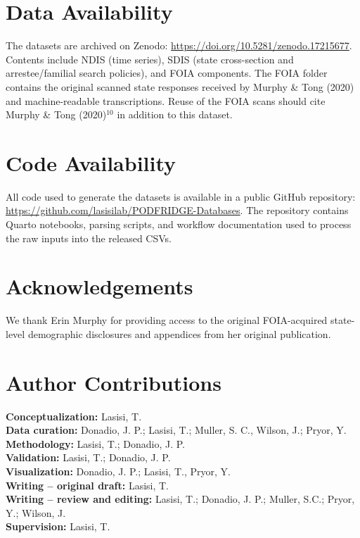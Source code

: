 \documentclass[11pt]{article}
\begin{document}
\clearpage

\section*{Data Availability}

The datasets are archived on Zenodo: \url{https://doi.org/10.5281/zenodo.17215677}. Contents include NDIS (time series), SDIS (state cross-section and arrestee/familial search policies), and FOIA components. The FOIA folder contains the original scanned state responses received by Murphy \& Tong (2020) and machine-readable transcriptions. Reuse of the FOIA scans should cite Murphy \& Tong (2020)$^{10}$ in addition to this dataset.

\section*{Code Availability}

All code used to generate the datasets is available in a public GitHub repository: \url{https://github.com/lasisilab/PODFRIDGE-Databases}. The repository contains Quarto notebooks, parsing scripts, and workflow documentation used to process the raw inputs into the released CSVs.

\section*{Acknowledgements}

We thank Erin Murphy for providing access to the original FOIA-acquired state-level demographic disclosures and appendices from her original publication.

\section*{Author Contributions}

\textbf{Conceptualization:} Lasisi, T. \\
\textbf{Data curation:} Donadio, J. P.; Lasisi, T.; Muller, S. C., Wilson, J.; Pryor, Y. \\
\textbf{Methodology:} Lasisi, T.; Donadio, J. P. \\
\textbf{Validation:} Lasisi, T.; Donadio, J. P. \\
\textbf{Visualization:} Donadio, J. P.; Lasisi, T., Pryor, Y. \\
\textbf{Writing -- original draft:} Lasisi, T. \\
\textbf{Writing -- review and editing:} Lasisi, T.; Donadio, J. P.; Muller, S.C.; Pryor, Y.; Wilson, J. \\
\textbf{Supervision:} Lasisi, T.
\end{document}
